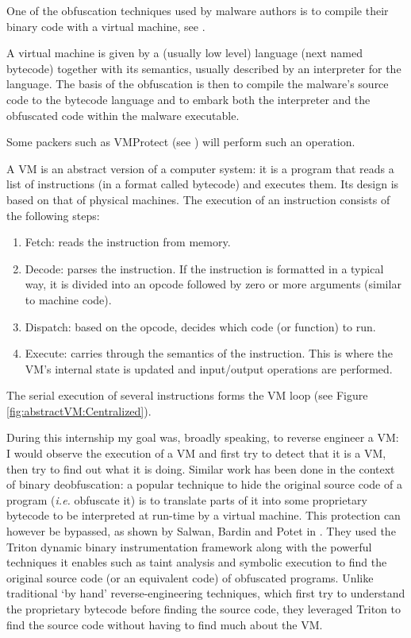 \documentclass[english]{article}
\begin{document}
One of the obfuscation techniques used by malware authors is
to compile their binary code with a virtual machine,
see \cite{surreptsoft}.

A virtual machine is given by a (usually low level) language (next named bytecode) together with its semantics,
usually described by an interpreter for the language. The basis of the
obfuscation is then to compile the malware's source code to the bytecode language and
to embark both the interpreter and the obfuscated code within the malware executable.

Some packers such as VMProtect (see \cite{vmprotect}) will perform such an operation.

A VM is an abstract version of a computer system: it is a program that reads a list of instructions (in a format called bytecode) and executes them. Its design is based on that of physical machines. The execution of an instruction consists of the following steps:
\begin{enumerate}
	\item Fetch: reads the instruction from memory.
	\item Decode: parses the instruction. If the instruction is formatted in a typical way, it is divided into an opcode followed by zero or more arguments (similar to machine code).
	\item Dispatch: based on the opcode, decides which code (or function) to run.
	\item Execute: carries through the semantics of the instruction. This is where the VM's internal state is updated and input/output operations are performed.
\end{enumerate}
The serial execution of several instructions forms the VM loop (see Figure \ref{fig:abstractVM:Centralized}).

During this internship my goal was, broadly speaking, to reverse engineer a VM: I would observe the execution of a VM and first try to detect that it is a VM, then try to find out what it is doing. Similar work has been done in the context of binary deobfuscation: a popular technique to hide the original source code of a program (\textit{i.e.} obfuscate it) is to translate parts of it into some proprietary bytecode to be interpreted at run-time by a virtual machine. This protection can however be bypassed, as shown by Salwan, Bardin and Potet in \cite{tritondeobfs}. They used the Triton dynamic binary instrumentation framework along with the powerful techniques it enables such as taint analysis and symbolic execution to find the original source code (or an equivalent code) of obfuscated programs. Unlike traditional `by hand' reverse-engineering techniques, which first try to understand the proprietary bytecode before finding the source code, they leveraged Triton to find the source code without having to find much about the VM. 
\end{document}
